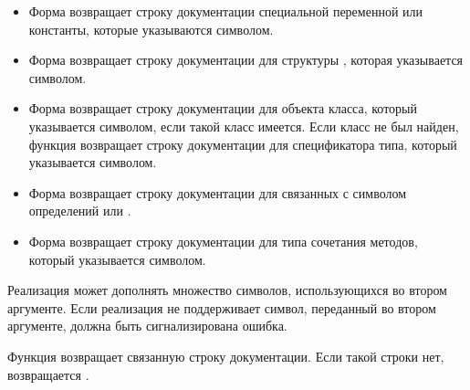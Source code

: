\begin{defun}
\begin{itemize}
\item 
Форма  возвращает строку
документации специальной переменной или константы, которые указываются символом.

\item 
Форма  возвращает строку
документации для структуры , которая указывается символом.

\item Форма  возвращает строку
  документации для объекта класса, который указывается символом, если такой
  класс имеется. Если класс не был найден, функция возвращает строку
  документации для спецификатора типа, который указывается символом.

\item 
Форма  возвращает строку документации
для связанных с символом определений  или  .

\item 
Форма  возвращает строку
документации для типа сочетания методов, который указывается символом.
\end{itemize}

Реализация может дополнять множество символов, использующихся во втором
аргументе. Если реализация не поддерживает символ, переданный во втором
аргументе, должна быть сигнализирована ошибка.

Функция возвращает связанную строку документации. Если такой строки нет,
возвращается .
\end{defun}


